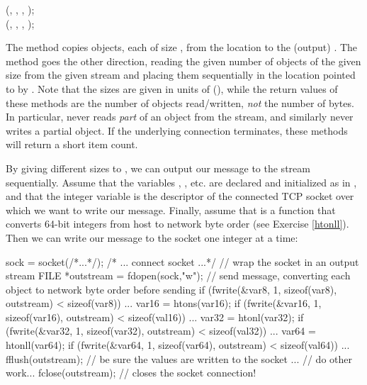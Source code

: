 \begin{inlinefcn}
 (,
 ,  ,  );\\
 (,
 ,  , );\\
\end{inlinefcn}

The  method copies  objects, each of size
, from the location  to the (output)
.  The  method goes the other direction,
reading the given number of objects of the given size from the given
stream and placing them sequentially in the location pointed to by
.  Note that the sizes are given in units of
(), while the return values of these methods
are the number of objects read/written, \emph{not\/} the number of
bytes.
In particular,  never reads \emph{part\/} of an object
from the stream, and similarly  never writes a partial
object.  If the underlying connection terminates, these methods will
return a short item count.

By giving different sizes to , we can output
our message to the stream sequentially.
Assume that the variables
, , etc. are declared and initialized as in
, and that the integer variable
 is the descriptor of the connected TCP socket
over which we want to write our message.  Finally, assume that
 is a function that converts 64-bit integers from host
to network byte order (see Exercise \ref{htonll}).
Then we can write our message to the socket one integer at a time:

\begin{inlinecode}
  sock = socket(/*...*/);
  /* ... connect socket ...*/
  // wrap the socket in an output stream
  FILE *outstream = fdopen(sock,"w");
  // send message, converting each object to network byte order before sending
    if (fwrite(&var8, 1, sizeof(var8), outstream) < sizeof(var8)) ...
  var16 = htons(var16);
  if (fwrite(&var16, 1, sizeof(var16), outstream) <  sizeof(val16)) ...
  var32 = htonl(var32);
  if (fwrite(&var32, 1, sizeof(var32), outstream) < sizeof(val32)) ...
  var64 = htonll(var64);
  if (fwrite(&var64, 1, sizeof(var64), outstream) < sizeof(val64)) ...
  fflush(outstream); // be sure the values are written to the socket
  ...                // do other work...
  fclose(outstream); // closes the socket connection!
\end{inlinecode}

